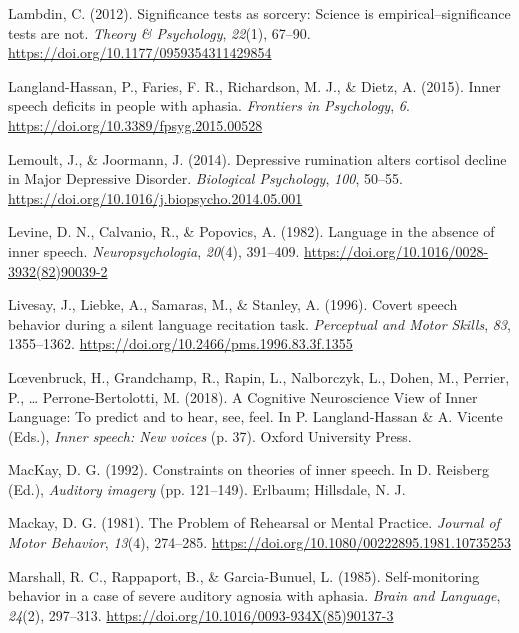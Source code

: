 \documentclass[a4paper,12pt,twoside,openright,oldfontcommands]{memoir}
\begin{document}
\hypertarget{ref-Lambdin2012}{}
Lambdin, C. (2012). Significance tests as sorcery: Science is
empirical--significance tests are not. \emph{Theory \& Psychology},
\emph{22}(1), 67--90. \url{https://doi.org/10.1177/0959354311429854}

\hypertarget{ref-langland-hassan_inner_2015}{}
Langland-Hassan, P., Faries, F. R., Richardson, M. J., \& Dietz, A.
(2015). Inner speech deficits in people with aphasia. \emph{Frontiers in
Psychology}, \emph{6}. \url{https://doi.org/10.3389/fpsyg.2015.00528}

\hypertarget{ref-Lemoult2014}{}
Lemoult, J., \& Joormann, J. (2014). Depressive rumination alters
cortisol decline in Major Depressive Disorder. \emph{Biological
Psychology}, \emph{100}, 50--55.
\url{https://doi.org/10.1016/j.biopsycho.2014.05.001}

\hypertarget{ref-levine_language_1982}{}
Levine, D. N., Calvanio, R., \& Popovics, A. (1982). Language in the
absence of inner speech. \emph{Neuropsychologia}, \emph{20}(4),
391--409. \url{https://doi.org/10.1016/0028-3932(82)90039-2}

\hypertarget{ref-livesay_covert_1996}{}
Livesay, J., Liebke, A., Samaras, M., \& Stanley, A. (1996). Covert
speech behavior during a silent language recitation task.
\emph{Perceptual and Motor Skills}, \emph{83}, 1355--1362.
\url{https://doi.org/10.2466/pms.1996.83.3f.1355}

\hypertarget{ref-loevenbruck_cognitive_2018}{}
Lœvenbruck, H., Grandchamp, R., Rapin, L., Nalborczyk, L., Dohen, M.,
Perrier, P., \ldots{} Perrone-Bertolotti, M. (2018). A Cognitive
Neuroscience View of Inner Language: To predict and to hear, see, feel.
In P. Langland-Hassan \& A. Vicente (Eds.), \emph{Inner speech: New
voices} (p. 37). Oxford University Press.

\hypertarget{ref-mackay_constraints_1992}{}
MacKay, D. G. (1992). Constraints on theories of inner speech. In D.
Reisberg (Ed.), \emph{Auditory imagery} (pp. 121--149). Erlbaum;
Hillsdale, N. J.

\hypertarget{ref-mackay_problem_1981}{}
Mackay, D. G. (1981). The Problem of Rehearsal or Mental Practice.
\emph{Journal of Motor Behavior}, \emph{13}(4), 274--285.
\url{https://doi.org/10.1080/00222895.1981.10735253}

\hypertarget{ref-marshall_self-monitoring_1985}{}
Marshall, R. C., Rappaport, B., \& Garcia-Bunuel, L. (1985).
Self-monitoring behavior in a case of severe auditory agnosia with
aphasia. \emph{Brain and Language}, \emph{24}(2), 297--313.
\url{https://doi.org/10.1016/0093-934X(85)90137-3}
\end{document}
